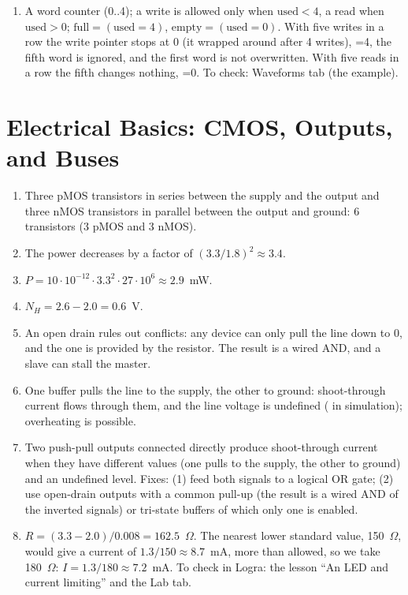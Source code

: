 \begin{enumerate}
  \item {} A word counter  (0..4); a write is allowed only when $\text{used}<4$, a read when $\text{used}>0$; $\text{full}=(\text{used}=4)$, $\text{empty}=(\text{used}=0)$. With five writes in a row the write pointer stops at 0 (it wrapped around after 4 writes), =4, the fifth word is ignored, and the first word is not overwritten. With five reads in a row the fifth changes nothing, =0. To check: Waveforms tab (the  example).
\end{enumerate}

\section*{Electrical Basics: CMOS, Outputs, and Buses}
\begin{enumerate}
  \item {} Three pMOS transistors in series between the supply and the output and three nMOS transistors in parallel between the output and ground: 6 transistors (3 pMOS and 3 nMOS).
  \item {} The power decreases by a factor of $(3.3/1.8)^2\approx 3.4$.
  \item {} $P = 10\cdot 10^{-12}\cdot 3.3^2\cdot 27\cdot 10^6 \approx 2.9$~mW.
  \item {} $N_H = 2.6 - 2.0 = 0.6$~V.
  \item {} An open drain rules out conflicts: any device can only pull the line down to 0, and the one is provided by the resistor. The result is a wired AND, and a slave can stall the master.
  \item {} One buffer pulls the line to the supply, the other to ground: shoot-through current flows through them, and the line voltage is undefined ( in simulation); overheating is possible.
  \item {} Two push-pull outputs connected directly produce shoot-through current when they have different values (one pulls to the supply, the other to ground) and an undefined level. Fixes: (1) feed both signals to a logical OR gate; (2) use open-drain outputs with a common pull-up (the result is a wired AND of the inverted signals) or tri-state buffers of which only one is enabled.
  \item {} $R=(3.3-2.0)/0.008=162.5$~$\Omega$. The nearest lower standard value, 150~$\Omega$, would give a current of $1.3/150\approx 8.7$~mA, more than allowed, so we take 180~$\Omega$: $I=1.3/180\approx 7.2$~mA. To check in Logra: the lesson ``An LED and current limiting'' and the Lab tab.

\end{enumerate}
